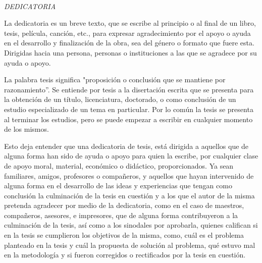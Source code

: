 

\newpage %
\newpage


\newpage
~\vfill

\emph{DEDICATORIA}
\hfill \break

La dedicatoria es un breve texto, que se escribe al principio  o al final de un libro, tesis, película, canción, etc., para expresar agradecimiento por el apoyo o ayuda en el desarrollo y finalización de la obra, sea del género  o formato que fuere esta. Dirigidas hacia una persona, personas o instituciones  a las que se agradece por su ayuda o apoyo.   

La palabra tesis significa "proposición o conclusión que se mantiene por razonamiento”. Se entiende por tesis a la  disertación escrita que se presenta para la obtención de un título, licenciatura, doctorado, o como conclusión de un estudio especializado de un tema en particular. Por lo común la tesis se presenta al terminar los estudios, pero se puede empezar  a escribir en cualquier momento de los mismos.

Esto deja entender que una dedicatoria de tesis, está dirigida a aquellos que de alguna forma han sido de ayuda o apoyo para quien la escribe, por cualquier clase de apoyo moral, material, económico o didáctico, proporcionados. Ya sean familiares, amigos, profesores o compañeros, y  aquellos que hayan intervenido de alguna forma en el desarrollo de las ideas y experiencias que tengan como conclusión la culminación de la tesis en cuestión y a los que el autor de la misma pretenda agradecer por medio de la dedicatoria, como en el caso de maestros, compañeros, asesores, e impresores, que  de alguna forma contribuyeron a la culminación de la tesis, así como a los sinodales por aprobarla, quienes califican si en la tesis se cumplieron los objetivos de la misma, como, cuál es el problema planteado en la tesis y cuál  la propuesta de solución al problema,  qué estuvo mal en la metodología y si fueron corregidos o rectificados por la tesis en cuestión.

